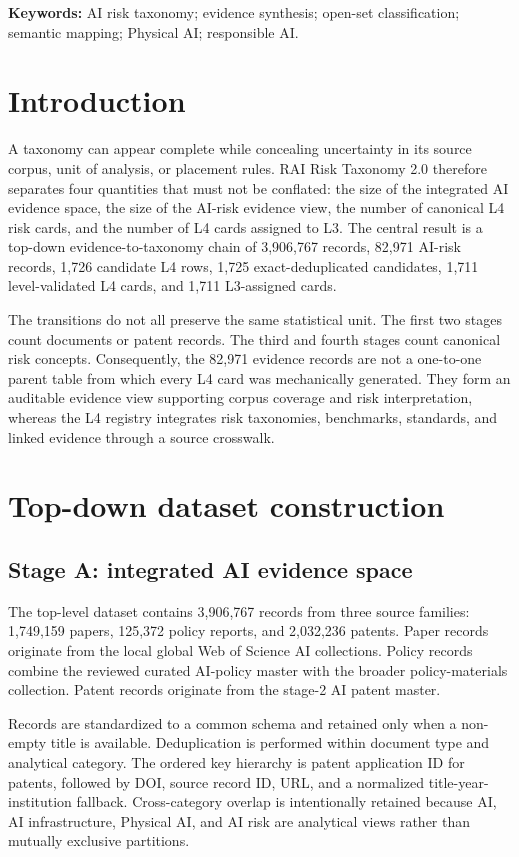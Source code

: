 \documentclass[11pt,a4paper]{article}
\begin{document}
\noindent\textbf{Keywords:} AI risk taxonomy; evidence synthesis; open-set
classification; semantic mapping; Physical AI; responsible AI.

\section{Introduction}

A taxonomy can appear complete while concealing uncertainty in its source
corpus, unit of analysis, or placement rules. RAI Risk Taxonomy 2.0 therefore
separates four quantities that must not be conflated: the size of the integrated
AI evidence space, the size of the AI-risk evidence view, the number of
canonical L4 risk cards, and the number of L4 cards assigned to L3. The central
result is a top-down evidence-to-taxonomy chain of 3,906,767 records, 82,971
AI-risk records, 1,726 candidate L4 rows, 1,725 exact-deduplicated candidates,
1,711 level-validated L4 cards, and 1,711 L3-assigned cards.

The transitions do not all preserve the same statistical unit. The first two
stages count documents or patent records. The third and fourth stages count
canonical risk concepts. Consequently, the 82,971 evidence records are not a
one-to-one parent table from which every L4 card was mechanically generated.
They form an auditable evidence view supporting corpus coverage and risk
interpretation, whereas the L4 registry integrates risk taxonomies, benchmarks,
standards, and linked evidence through a source crosswalk.

\section{Top-down dataset construction}

\subsection{Stage A: integrated AI evidence space}

The top-level dataset contains 3,906,767 records from three source families:
1,749,159 papers, 125,372 policy reports, and 2,032,236 patents. Paper records
originate from the local global Web of Science AI collections. Policy records
combine the reviewed curated AI-policy master with the broader policy-materials
collection. Patent records originate from the stage-2 AI patent master.

Records are standardized to a common schema and retained only when a non-empty
title is available. Deduplication is performed within document type and
analytical category. The ordered key hierarchy is patent application ID for
patents, followed by DOI, source record ID, URL, and a normalized
title-year-institution fallback. Cross-category overlap is intentionally
retained because AI, AI infrastructure, Physical AI, and AI risk are analytical
views rather than mutually exclusive partitions.
\end{document}
